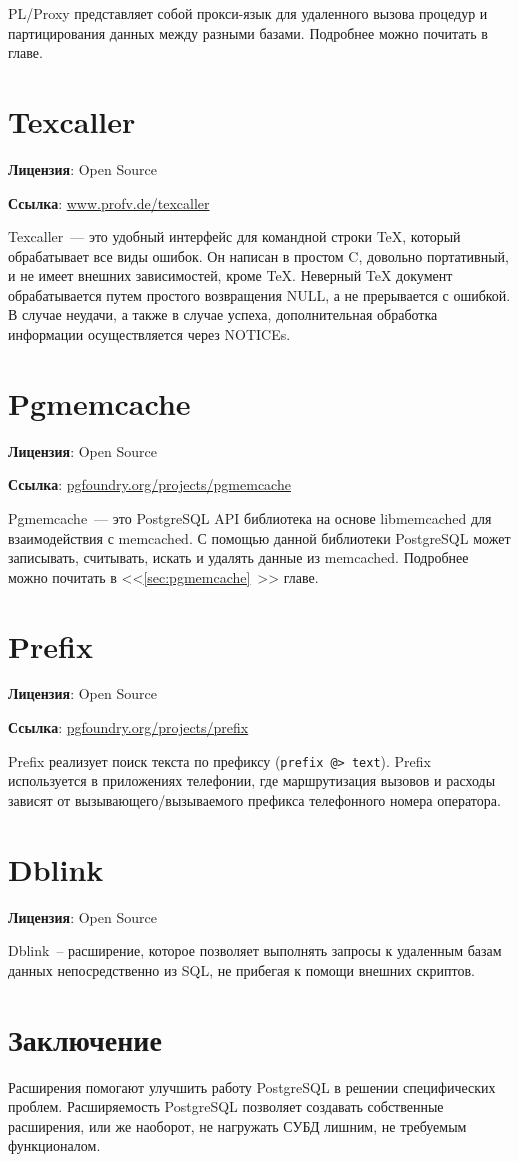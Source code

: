 PL/Proxy представляет собой прокси-язык для удаленного вызова процедур и партицирования данных между разными базами. Подробнее можно почитать в  главе.

\section{Texcaller}
\textbf{Лицензия}: Open Source

\textbf{Ссылка}: \href{http://www.profv.de/texcaller/}{www.profv.de/texcaller}

Texcaller~--- это удобный интерфейс для командной строки TeX, который обрабатывает все виды ошибок. Он написан в простом C, довольно портативный, и не имеет внешних зависимостей, кроме TeX. Неверный TeX документ обрабатывается путем простого возвращения NULL, а не прерывается с ошибкой. В случае неудачи, а также в случае успеха, дополнительная обработка информации осуществляется через NOTICEs.

\section{Pgmemcache}
\textbf{Лицензия}: Open Source

\textbf{Ссылка}: \href{http://pgfoundry.org/projects/pgmemcache/}{pgfoundry.org/projects/pgmemcache}

Pgmemcache~--- это PostgreSQL API библиотека на основе libmemcached для взаимодействия с memcached. С помощью данной библиотеки PostgreSQL может записывать, считывать, искать и удалять данные из memcached. Подробнее можно почитать в <<\ref{sec:pgmemcache}~>> главе.

\section{Prefix}
\textbf{Лицензия}: Open Source

\textbf{Ссылка}: \href{http://pgfoundry.org/projects/prefix}{pgfoundry.org/projects/prefix}

Prefix реализует поиск текста по префиксу (\lstinline!prefix @> text!). Prefix используется в приложениях телефонии, где маршрутизация вызовов и расходы зависят от вызывающего/вызываемого префикса телефонного номера оператора.

\section{Dblink}
\textbf{Лицензия}: Open Source

Dblink~-- расширение, которое позволяет выполнять запросы к удаленным базам данных непосредственно из SQL, не прибегая к помощи внешних скриптов.

\section{Заключение}

Расширения помогают улучшить работу PostgreSQL в решении специфических проблем. Расширяемость PostgreSQL позволяет создавать собственные расширения, или же наоборот, не нагружать СУБД лишним, не требуемым функционалом.